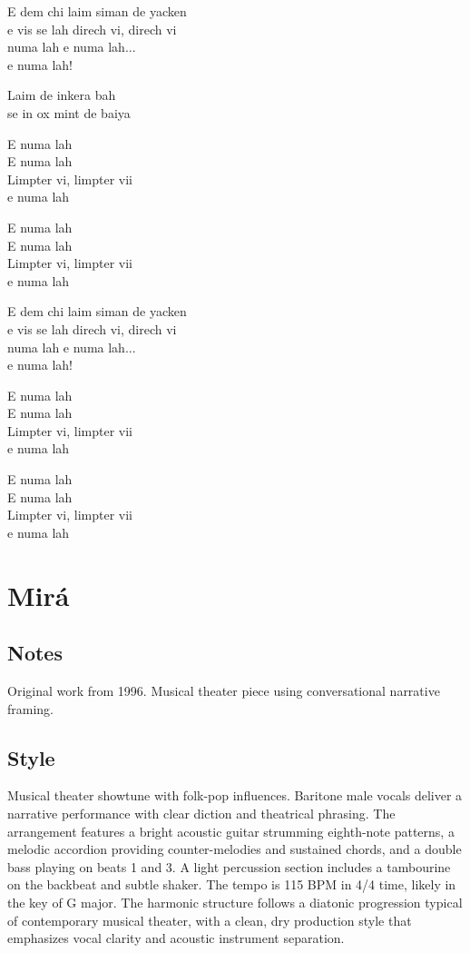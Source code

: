 \begin{lyrics}
E dem chi laim siman de yacken\\
e vis se lah direch vi, direch vi\\
numa lah e numa lah...\\
e numa lah!

Laim de inkera bah\\
se in ox mint de baiya

E numa lah\\
E numa lah\\
Limpter vi, limpter vii\\
e numa lah

E numa lah\\
E numa lah\\
Limpter vi, limpter vii\\
e numa lah

E dem chi laim siman de yacken\\
e vis se lah direch vi, direch vi\\
numa lah e numa lah...\\
e numa lah!

E numa lah\\
E numa lah\\
Limpter vi, limpter vii\\
e numa lah

E numa lah\\
E numa lah\\
Limpter vi, limpter vii\\
e numa lah
\end{lyrics}

\section{Mirá}

\subsection{Notes}
Original work from 1996.
Musical theater piece using conversational narrative framing.

\subsection{Style}
Musical theater showtune with folk-pop influences. Baritone male vocals deliver a narrative performance with clear diction and theatrical phrasing. The arrangement features a bright acoustic guitar strumming eighth-note patterns, a melodic accordion providing counter-melodies and sustained chords, and a double bass playing on beats 1 and 3. A light percussion section includes a tambourine on the backbeat and subtle shaker. The tempo is 115 BPM in 4/4 time, likely in the key of G major. The harmonic structure follows a diatonic progression typical of contemporary musical theater, with a clean, dry production style that emphasizes vocal clarity and acoustic instrument separation.

